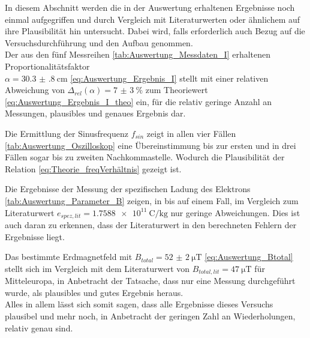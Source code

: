 In diesem Abschnitt werden die in der Auswertung erhaltenen Ergebnisse 
noch einmal aufgegriffen und durch Vergleich mit Literaturwerten 
oder ähnlichem auf ihre Plausibilität hin untersucht. Dabei 
wird, falls erforderlich auch Bezug auf die Versuchsdurchführung 
und den Aufbau genommen. \\

Der aus den fünf Messreihen \cref{tab:Auswertung_Messdaten_I} erhaltenen Proportionalitätsfaktor\\  $ \alpha = \SI{30.3(8)}{\centi\meter}$ \cref{eq:Auswertung_Ergebnis_I} 
stellt mit einer relativen Abweichung von $\Delta_{rel}(\alpha) = \SI{7(3)}{\percent}$ zum 
Theoriewert \cref{eq:Auswertung_Ergebnis_I_theo} ein, für die relativ geringe Anzahl an Messungen, 
plausibles und genaues Ergebnis dar.

Die Ermittlung der Sinusfrequenz $f_{sin}$ zeigt in allen vier Fällen 
\cref{tab:Auswertung_Oszilloskop} eine Übereinstimmung bis zur ersten und
in drei Fällen sogar bis zu zweiten Nachkommastelle. Wodurch die
Plausibilität der Relation \cref{eq:Theorie_freqVerhältnis} gezeigt ist.

Die Ergebnisse der Messung der spezifischen Ladung des Elektrons 
\cref{tab:Auswertung_Parameter_B} zeigen, in bis auf einem Fall, 
im Vergleich zum Literaturwert
$e_{spez,lit} = \SI{1.7588e11}{\coulomb\per\kilo\g}$\cite{Mende09} nur geringe Abweichungen.
Dies ist auch daran zu erkennen, dass der Literaturwert in den berechneten 
Fehlern der Ergebnisse liegt.

Das bestimmte Erdmagnetfeld mit $B_{total} =  \SI{52(2)}{\micro\tesla}$ 
\cref{eq:Auswertung_Btotal} stellt sich im Vergleich mit dem Literaturwert von
$B_{total,lit} = \SI{47}{\micro\tesla}$ \cite{GGU} für Mitteleuropa,
in Anbetracht der Tatsache, dass nur eine Messung durchgeführt wurde, als 
plausibles und gutes Ergebnis heraus. \\

Alles in allem lässt sich somit sagen, dass alle Ergebnisse dieses Versuchs
plausibel und mehr noch, in Anbetracht der geringen Zahl an Wiederholungen,
relativ genau sind.
